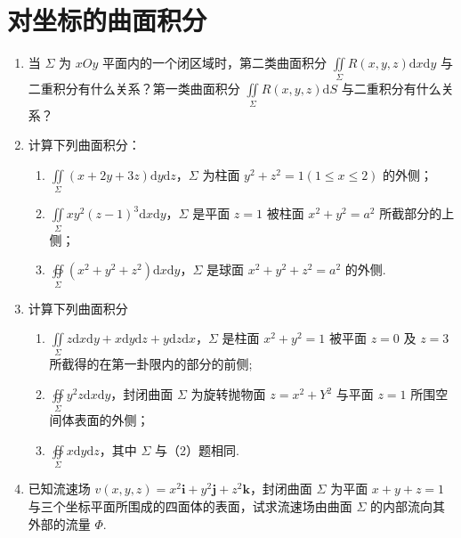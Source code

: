 \section{对坐标的曲面积分}

\begin{enumerate}\setlength{\itemsep}{7pt}
    \item 当 $\Sigma$ 为 $xOy$ 平面内的一个闭区域时，第二类曲面积分 $\displaystyle\iint\limits_{\Sigma}R(x, y, z)\text{d}x\text{d}y$ 与二重积分有什么关系？第一类曲面积分 $\displaystyle\iint\limits_{\Sigma}R(x, y, z)\text{d}S$ 与二重积分有什么关系？
    
    \item 计算下列曲面积分：
    \begin{enumerate}[(1)]\setlength{\itemsep}{5pt}\setlength{\topsep}{15pt}
        \item $\displaystyle\iint\limits_{\Sigma}(x+2y+3z)\text{d}y\text{d}z$，$\Sigma$ 为柱面 $y^2+z^2=1(1\leqslant x\leqslant2)$ 的外侧；
        \item $\displaystyle\iint\limits_{\Sigma}xy^2(z-1)^3\text{d}x\text{d}y$，$\Sigma$ 是平面 $z=1$ 被柱面 $x^2+y^2=a^2$ 所截部分的上侧；
        \item $\displaystyle\oiint\limits_{\Sigma}(x^2+y^2+z^2)\text{d}x\text{d}y$，$\Sigma$ 是球面 $x^2+y^2+z^2=a^2$ 的外侧.
    \end{enumerate}

    \item 计算下列曲面积分
    \begin{enumerate}[(1)]\setlength{\itemsep}{5pt}\setlength{\topsep}{15pt}
        \item $\displaystyle\iint\limits_{\Sigma}z\text{d}x\text{d}y+x\text{d}y\text{d}z+y\text{d}z\text{d}x$，$\Sigma$ 是柱面 $x^2+y^2=1$ 被平面 $z=0$ 及 $z=3$ 所截得的在第一卦限内的部分的前侧;
        \item $\displaystyle\oiint\limits_{\Sigma}y^2z\text{d}x\text{d}y$，封闭曲面 $\Sigma$ 为旋转抛物面 $z=x^2+Y^2$ 与平面 $z=1$ 所围空间体表面的外侧；
        \item $\displaystyle\oiint\limits_{\Sigma}x\text{d}y\text{d}z$，其中 $\Sigma$ 与（2）题相同.
    \end{enumerate}

    \item 已知流速场 $v(x, y, z)=x^2\boldsymbol{i}+y^2\boldsymbol{j}+z^2\boldsymbol{k}$，封闭曲面 $\Sigma$ 为平面 $x+y+z=1$ 与三个坐标平面所围成的四面体的表面，试求流速场由曲面 $\Sigma$ 的内部流向其外部的流量 $\Phi$.
    

\end{enumerate}
